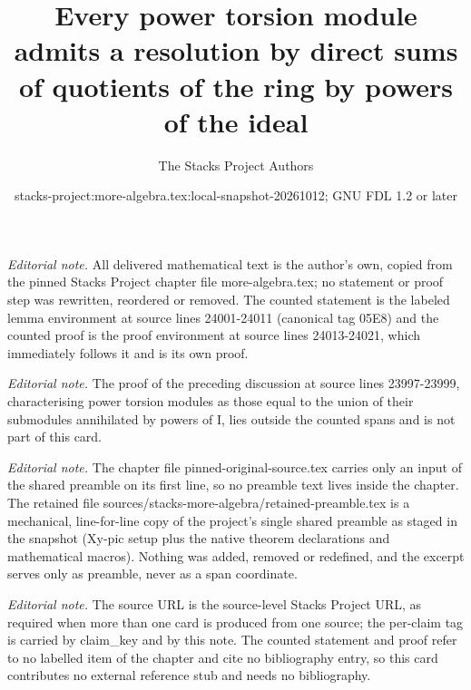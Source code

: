 \documentclass[10pt,a4paper]{amsart}
\title{Every power torsion module admits a resolution by direct sums of quotients of the ring by powers of the ideal}
\author{The Stacks Project Authors}
\date{stacks-project:more-algebra.tex:local-snapshot-20261012; GNU FDL 1.2 or later}
\theoremstyle{plain}
\theoremstyle{definition}
\theoremstyle{remark}
\numberwithin{equation}{subsection}
\begin{document}
\maketitle
\setcounter{subsection}{1}
\noindent\textit{Editorial note.} All delivered mathematical text is the author's own, copied from the pinned Stacks Project chapter file more-algebra.tex; no statement or proof step was rewritten, reordered or removed. The counted statement is the labeled lemma environment at source lines 24001-24011 (canonical tag 05E8) and the counted proof is the proof environment at source lines 24013-24021, which immediately follows it and is its own proof.\par\medskip
\noindent\textit{Editorial note.} The proof of the preceding discussion at source lines 23997-23999, characterising power torsion modules as those equal to the union of their submodules annihilated by powers of I, lies outside the counted spans and is not part of this card.\par\medskip
\noindent\textit{Editorial note.} The chapter file pinned-original-source.tex carries only an input of the shared preamble on its first line, so no preamble text lives inside the chapter. The retained file sources/stacks-more-algebra/retained-preamble.tex is a mechanical, line-for-line copy of the project's single shared preamble as staged in the snapshot (Xy-pic setup plus the native theorem declarations and mathematical macros). Nothing was added, removed or redefined, and the excerpt serves only as preamble, never as a span coordinate.\par\medskip
\noindent\textit{Editorial note.} The source URL is the source-level Stacks Project URL, as required when more than one card is produced from one source; the per-claim tag is carried by claim\_key and by this note. The counted statement and proof refer to no labelled item of the chapter and cite no bibliography entry, so this card contributes no external reference stub and needs no bibliography.\par\medskip
\end{document}
